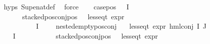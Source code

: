 \begin{isabellebody}
\ \ \ \ \isamarkupfalse%
\ {\isachardoublequoteopen}{}{\isachardot}{\kern0pt}hyps{\isachardoublequoteclose}\ Sup{\isacharunderscore}{\kern0pt}enat{\isacharunderscore}{\kern0pt}def\ \isamarkupfalse%
\ force{\isacharplus}{\kern0pt}\isanewline
\ \ \isamarkupfalse%
\ case{\isacharunderscore}{\kern0pt}pos{\isacharcolon}{\kern0pt}\ {\isachardoublequoteopen}{\isacharparenleft}{\kern0pt}{\isasymexists}{\isasymphi}{\isasymin}{\isasymPhi}\ {\isacharbackquote}{\kern0pt}\ I{\isachardot}{\kern0pt}\isanewline
\ \ \ \ \ \ \ \ \ \ \ {\isacharparenleft}{\kern0pt}stacked{\isacharunderscore}{\kern0pt}pos{\isacharunderscore}{\kern0pt}conj{\isacharunderscore}{\kern0pt}pos\ {\isasymphi}\ {\isasymand}\ less{\isacharunderscore}{\kern0pt}eq{\isacharunderscore}{\kern0pt}t\ {\isacharparenleft}{\kern0pt}expr\ {\isasymphi}{\isacharparenright}{\kern0pt}\ {\isacharparenleft}{\kern0pt}{}{\isacharcomma}{\kern0pt}\ {\isasyminfinity}{\isacharcomma}{\kern0pt}\ {}{\isacharcomma}{\kern0pt}\ {}{\isacharcomma}{\kern0pt}\ {}{\isacharcomma}{\kern0pt}\ {}{\isacharparenright}{\kern0pt}{\isacharparenright}{\kern0pt}\ {\isasymand}\isanewline
\ \ \ \ \ \ \ \ \ \ \ {\isacharparenleft}{\kern0pt}{\isasymforall}{\isasympsi}\ {\isasymin}\ {\isasymPhi}\ {\isacharbackquote}{\kern0pt}\ I{\isachardot}{\kern0pt}\ {\isasympsi}\ {\isasymnoteq}\ {\isasymphi}\ {\isasymlongrightarrow}\ nested{\isacharunderscore}{\kern0pt}empty{\isacharunderscore}{\kern0pt}pos{\isacharunderscore}{\kern0pt}conj\ {\isasympsi}{\isacharparenright}{\kern0pt}{\isacharparenright}{\kern0pt}\ {\isasymlongrightarrow}\ \isanewline
less{\isacharunderscore}{\kern0pt}eq{\isacharunderscore}{\kern0pt}t\ {\isacharparenleft}{\kern0pt}expr\ {\isacharparenleft}{\kern0pt}hml{\isacharunderscore}{\kern0pt}conj\ I\ J\ {\isasymPhi}{\isacharparenright}{\kern0pt}{\isacharparenright}{\kern0pt}\ {\isacharparenleft}{\kern0pt}{}{\isacharcomma}{\kern0pt}\ {\isasyminfinity}{\isacharcomma}{\kern0pt}\ {}{\isacharcomma}{\kern0pt}\ {}{\isacharcomma}{\kern0pt}\ {}{\isacharcomma}{\kern0pt}\ {}{\isacharparenright}{\kern0pt}{\isachardoublequoteclose}\isanewline
\ \ \isamarkupfalse%
\isanewline
\ \ \isamarkupfalse%
\ {\isachardoublequoteopen}{\isacharparenleft}{\kern0pt}{\isasymexists}{\isasymphi}{\isasymin}{\isasymPhi}\ {\isacharbackquote}{\kern0pt}\ I{\isachardot}{\kern0pt}\isanewline
\ \ \ \ \ \ \ \ \ \ \ {\isacharparenleft}{\kern0pt}stacked{\isacharunderscore}{\kern0pt}pos{\isacharunderscore}{\kern0pt}conj{\isacharunderscore}{\kern0pt}pos\ {\isasymphi}\ {\isasymand}\ less{\isacharunderscore}{\kern0pt}eq{\isacharunderscore}{\kern0pt}t\ {\isacharparenleft}{\kern0pt}expr\ {\isasymphi}{\isacharparenright}{\kern0pt}\ {\isacharparenleft}{\kern0pt}{}{\isacharcomma}{\kern0pt}\ {\isasyminfinity}{\isacharcomma}{\kern0pt}\ {}{\isacharcomma}{\kern0pt}\ {}{\isacharcomma}{\kern0pt}\ {}{\isacharcomma}{\kern0pt}\ {}{\isacharparenright}{\kern0pt}{\isacharparenright}{\kern0pt}\ {\isasymand}\isanewline

\end{isabellebody}
